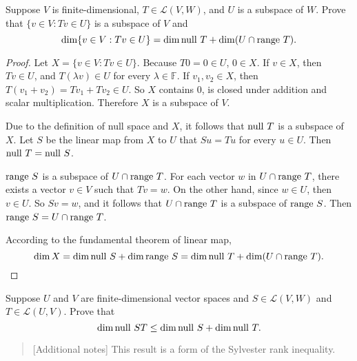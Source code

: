 \begin{exercise}\label{chapter3:sectionB:exercise21}
    Suppose $V$ is finite-dimensional, $T \in \mathcal{L}(V, W)$, and $U$ is a subspace of $W$. Prove that $\{v \in V : Tv \in U\}$ is a subspace of $V$ and
    \[
        \dim\{ v\in V : Tv\in U \} = \dim \operatorname{null}\,{T} + \dim (U\cap \operatorname{range}\,{T}).
    \]
\end{exercise}

\begin{proof}
    Let $X = \{v \in V : Tv \in U\}$. Because $T0 = 0\in U$, $0\in X$. If $v\in X$, then $Tv\in U$, and $T(\lambda v)\in U$ for every $\lambda\in\mathbb{F}$. If $v_{1}, v_{2}\in X$, then $T(v_{1} + v_{2}) = Tv_{1} + Tv_{2}\in U$. So $X$ contains $0$, is closed under addition and scalar multiplication. Therefore $X$ is a subspace of $V$.

    Due to the definition of null space and $X$, it follows that $\operatorname{null}\,{T}$ is a subspace of $X$. Let $S$ be the linear map from $X$ to $U$ that $Su = Tu$ for every $u\in U$. Then $\operatorname{null}\,{T} = \operatorname{null}\,{S}$.

    $\operatorname{range}\,{S}$ is a subspace of $U\cap \operatorname{range}\,{T}$. For each vector $w$ in $U\cap \operatorname{range}\,{T}$, there exists a vector $v\in V$ such that $Tv = w$. On the other hand, since $w\in U$, then $v\in U$. So $Sv = w$, and it follows that $U\cap \operatorname{range}\,{T}$ is a subspace of $\operatorname{range}\,{S}$. Then $\operatorname{range}\,{S} = U\cap \operatorname{range}\,{T}$.

    According to the fundamental theorem of linear map,
    \[
        \dim X = \dim\operatorname{null}\,{S} + \dim\operatorname{range}\,{S} = \dim\operatorname{null}\,{T} + \dim (U\cap\operatorname{range}\,{T}).\qedhere
    \]
\end{proof}
\newpage

\begin{exercise}\label{chapter3:sectionB:exercise22}
    Suppose $U$ and $V$ are finite-dimensional vector spaces and $S \in \mathcal{L}(V, W)$ and $T \in \mathcal{L}(U, V)$. Prove that
    \[
        \dim\operatorname{null}\,{ST} \leq \dim\operatorname{null}\,{S} + \dim\operatorname{null}\,{T}.
    \]
\end{exercise}

\begin{quote}[Additional notes]
    This result is a form of the Sylvester rank inequality.
\end{quote}

